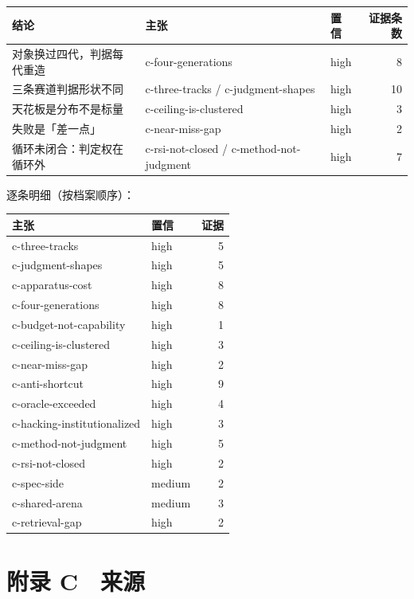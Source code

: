 \begin{table}[t]
\centering
\footnotesize
\setlength{\tabcolsep}{4pt}
\label{tab:7}
\begin{tabularx}{\textwidth}{lXlr}
\toprule
结论 & 主张 & 置信 & 证据条数 \\
\midrule
对象换过四代，判据每代重造 & c-four-generations & high & 8 \\
三条赛道判据形状不同 & c-three-tracks / c-judgment-shapes & high & 10 \\
天花板是分布不是标量 & c-ceiling-is-clustered & high & 3 \\
失败是「差一点」 & c-near-miss-gap & high & 2 \\
循环未闭合：判定权在循环外 & c-rsi-not-closed / c-method-not-judgment & high & 7 \\
\bottomrule
\end{tabularx}
\end{table}

逐条明细（按档案顺序）：


\begin{table}[t]
\centering
\footnotesize
\setlength{\tabcolsep}{4pt}
\label{tab:8}
\begin{tabularx}{\textwidth}{Xlr}
\toprule
主张 & 置信 & 证据 \\
\midrule
c-three-tracks & high & 5 \\
c-judgment-shapes & high & 5 \\
c-apparatus-cost & high & 8 \\
c-four-generations & high & 8 \\
c-budget-not-capability & high & 1 \\
c-ceiling-is-clustered & high & 3 \\
c-near-miss-gap & high & 2 \\
c-anti-shortcut & high & 9 \\
c-oracle-exceeded & high & 4 \\
c-hacking-institutionalized & high & 3 \\
c-method-not-judgment & high & 5 \\
c-rsi-not-closed & high & 2 \\
c-spec-side & medium & 2 \\
c-shared-arena & medium & 3 \\
c-retrieval-gap & high & 2 \\
\bottomrule
\end{tabularx}
\end{table}

\section{附录 C　来源}

